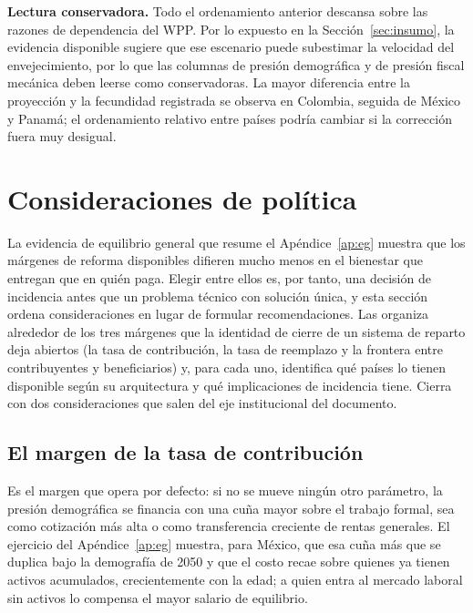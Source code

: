 \documentclass[12pt, letterpaper]{article}
\begin{document}
\textbf{Lectura conservadora.} Todo el ordenamiento anterior descansa sobre las
razones de dependencia del WPP. Por lo expuesto en la Sección~\ref{sec:insumo}, la
evidencia disponible sugiere que ese escenario puede subestimar la velocidad del
envejecimiento, por lo que las columnas de presión demográfica y de presión fiscal
mecánica deben leerse como conservadoras. La mayor diferencia entre la proyección
y la fecundidad registrada se observa en Colombia, seguida de México y Panamá; el
ordenamiento relativo entre países podría cambiar si la corrección fuera muy
desigual.

\newpage
\section{Consideraciones de política}
\label{sec:politica}

La evidencia de equilibrio general que resume el Apéndice~\ref{ap:eg} muestra que
los márgenes de reforma disponibles difieren mucho menos en el bienestar que
entregan que en quién paga. Elegir entre ellos es, por tanto, una decisión de
incidencia antes que un problema técnico con solución única, y esta sección ordena
consideraciones en lugar de formular recomendaciones. Las organiza alrededor de los
tres márgenes que la identidad de cierre de un sistema de reparto deja abiertos (la
tasa de contribución, la tasa de reemplazo y la frontera entre contribuyentes y
beneficiarios) y, para cada uno, identifica qué países lo tienen disponible según
su arquitectura y qué implicaciones de incidencia tiene. Cierra con dos
consideraciones que salen del eje institucional del documento.

\subsection{El margen de la tasa de contribución}

Es el margen que opera por defecto: si no se mueve ningún otro parámetro, la
presión demográfica se financia con una cuña mayor sobre el trabajo formal, sea
como cotización más alta o como transferencia creciente de rentas generales. El
ejercicio del Apéndice~\ref{ap:eg} muestra, para México, que esa cuña más que se
duplica bajo la demografía de 2050 y que el costo recae sobre quienes ya tienen
activos acumulados, crecientemente con la edad; a quien entra al mercado laboral
sin activos lo compensa el mayor salario de equilibrio.
\end{document}
